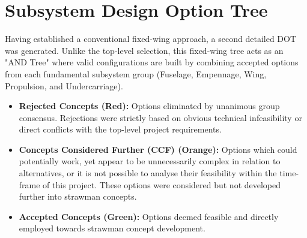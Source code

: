 \section{Subsystem Design Option Tree}
\label{sec:design_option_tree}
Having established a conventional fixed-wing approach, a second detailed DOT was generated. Unlike the top-level selection, this fixed-wing tree acts as an "AND Tree" where valid configurations are built by combining accepted options from each fundamental subsystem group (Fuselage, Empennage, Wing, Propulsion, and Undercarriage). 

\begin{itemize}
    \item \textbf{Rejected Concepts (Red):} Options eliminated by unanimous group consensus. Rejections were strictly based on obvious technical infeasibility or direct conflicts with the top-level project requirements.
    \item \textbf{Concepts Considered Further (CCF) (Orange):} Options which could potentially work, yet appear to be unnecessarily complex in relation to alternatives, or it is not possible to analyse their feasibility within the time-frame of this project. These options were considered but not developed further into strawman concepts.
    \item \textbf{Accepted Concepts (Green):} Options deemed feasible and directly employed towards strawman concept development.
\end{itemize}

